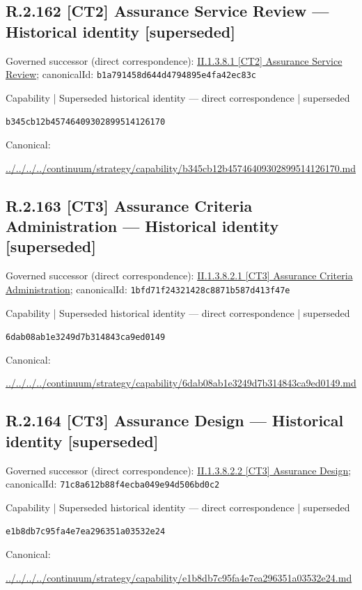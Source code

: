 \documentclass[10pt,a4paper]{article}
\begin{document}
\subsection*{R.2.162 [CT2] Assurance Service Review — Historical identity [superseded]}
Governed successor (direct correspondence): \hyperref[element-b1a791458d644d4794895e4fa42ec83c]{II.1.3.8.1 [CT2] Assurance Service Review}; canonicalId: \texttt{b1a791458d644d4794895e4fa42ec83c}\par
\label{element-b345cb12b45746409302899514126170}
{\small Capability | Superseded historical identity — direct correspondence | superseded}\par
\texttt{b345cb12b45746409302899514126170}\par
Canonical: \par
{\footnotesize\url{../../../../continuum/strategy/capability/b345cb12b45746409302899514126170.md}}\par
\subsection*{R.2.163 [CT3] Assurance Criteria Administration — Historical identity [superseded]}
Governed successor (direct correspondence): \hyperref[element-1bfd71f24321428c8871b587d413f47e]{II.1.3.8.2.1 [CT3] Assurance Criteria Administration}; canonicalId: \texttt{1bfd71f24321428c8871b587d413f47e}\par
\label{element-6dab08ab1e3249d7b314843ca9ed0149}
{\small Capability | Superseded historical identity — direct correspondence | superseded}\par
\texttt{6dab08ab1e3249d7b314843ca9ed0149}\par
Canonical: \par
{\footnotesize\url{../../../../continuum/strategy/capability/6dab08ab1e3249d7b314843ca9ed0149.md}}\par
\subsection*{R.2.164 [CT3] Assurance Design — Historical identity [superseded]}
Governed successor (direct correspondence): \hyperref[element-71c8a612b88f4ecba049e94d506bd0c2]{II.1.3.8.2.2 [CT3] Assurance Design}; canonicalId: \texttt{71c8a612b88f4ecba049e94d506bd0c2}\par
\label{element-e1b8db7c95fa4e7ea296351a03532e24}
{\small Capability | Superseded historical identity — direct correspondence | superseded}\par
\texttt{e1b8db7c95fa4e7ea296351a03532e24}\par
Canonical: \par
{\footnotesize\url{../../../../continuum/strategy/capability/e1b8db7c95fa4e7ea296351a03532e24.md}}\par
\end{document}
